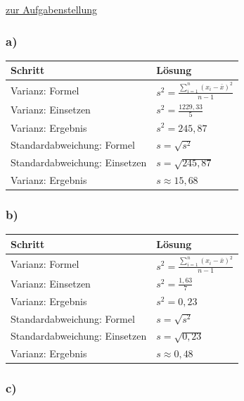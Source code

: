\documentclass[
  11pt,
  ngerman,
  a4paper,
]{report}
\begin{document}
\protect\hyperlink{aufgabe-2-2}{zur Aufgabenstellung}

\hypertarget{a-3}{%
\subsubsection{a)}\label{a-3}}

\begin{table}[H]
\centering
\begin{tabular}{ll}
\toprule
\textbf{Schritt} & \textbf{Lösung}\\
\midrule
Varianz: Formel & $s^2=\frac{\sum\limits_{i=1}^{n}(x_{i}-\bar{x})^2}{n-1}$\\
Varianz: Einsetzen & $s^2=\frac{1229{,}33}{5}$\\
Varianz: Ergebnis & $s^2=245{,}87$\\
Standardabweichung: Formel & $s=\sqrt{s^2}$\\
Standardabweichung: Einsetzen & $s=\sqrt{245{,}87}$\\
Varianz: Ergebnis & $s\approx15{,}68$\\
\bottomrule
\end{tabular}
\end{table}

\hypertarget{b-3}{%
\subsubsection{b)}\label{b-3}}

\begin{table}[H]
\centering
\begin{tabular}{ll}
\toprule
\textbf{Schritt} & \textbf{Lösung}\\
\midrule
Varianz: Formel & $s^2=\frac{\sum\limits_{i=1}^{n}(x_{i}-\bar{x})^2}{n-1}$\\
Varianz: Einsetzen & $s^2=\frac{1{,}63}{7}$\\
Varianz: Ergebnis & $s^2=0{,}23$\\
Standardabweichung: Formel & $s=\sqrt{s^2}$\\
Standardabweichung: Einsetzen & $s=\sqrt{0{,}23}$\\
Varianz: Ergebnis & $s\approx0{,}48$\\
\bottomrule
\end{tabular}
\end{table}

\hypertarget{c-3}{%
\subsubsection{c)}\label{c-3}}
\end{document}

